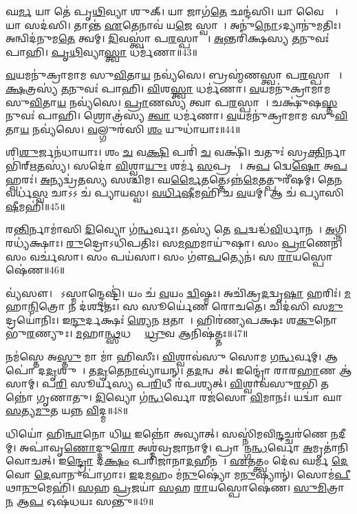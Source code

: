 𑌘\ul{𑌰𑍍𑌮} 𑌯𑌾 𑌤𑍇॑ 𑌪𑍃\ul{𑌥𑌿}𑌵𑍍𑌯𑌾 𑌶𑍁𑌕𑍍। 
𑌯𑌾 𑌜𑌾𑌗॑\ul{𑌤𑍇} 𑌛𑌨𑍍𑌦॑𑌸𑌿। 
𑌯𑌾 𑌵𑍈𑌶𑍍𑌯𑍇᳚। 
𑌯𑌾 𑌸𑌦॑𑌸𑌿। 
𑌤𑌾𑌨𑍍𑌤॑ \ul{𑌏}𑌤𑍇𑌨𑌾𑌵॑ 𑌯\ul{𑌜𑍇} 𑌸𑍍𑌵𑌾𑌹𑌾᳚। 
𑌅𑌨𑍁॑\ul{𑌨𑍋}𑌽𑌦𑍍𑌯𑌾𑌨𑍁॑𑌮𑌤𑌿𑌃। 
𑌅𑌨𑍍𑌵𑌿𑌦॑𑌨𑍁𑌮\ul{𑌤𑍇} 𑌤𑍍𑌵𑌮𑍍। 
\ul{𑌦𑌿}𑌵𑌸𑍍𑌤𑍍𑌵𑌾॑ 𑌪\ul{𑌰}𑌸𑍍𑌪𑌾𑌯𑌾𑌃᳚। 
\ul{𑌅}𑌨𑍍𑌤𑌰𑌿॑𑌕𑍍𑌷𑌸𑍍𑌯 \ul{𑌤}𑌨𑍁𑌵𑌃॑ 𑌪𑌾𑌹𑌿। 
\ul{𑌪𑍃}\ul{𑌥𑌿}𑌵𑍍𑌯𑌾\ul{𑌸𑍍𑌤𑍍𑌵𑌾} 𑌧𑌰𑍍𑌮॑𑌣𑌾॥43॥

\ul{𑌵}𑌯𑌮𑌨𑍁॑𑌕𑍍𑌰𑌾𑌮𑌾𑌮 𑌸𑍁\ul{𑌵𑌿}𑌤𑌾\ul{𑌯} 𑌨𑌵𑍍𑌯॑𑌸𑍇। 
𑌬𑍍𑌰𑌹𑍍𑌮॑𑌣𑌸𑍍𑌤𑍍𑌵𑌾 𑌪\ul{𑌰}𑌸𑍍𑌪𑌾𑌯𑌾𑌃᳚। 
\ul{𑌕𑍍𑌷}𑌤𑍍𑌰𑌸𑍍𑌯॑ \ul{𑌤}𑌨𑍁𑌵𑌃॑ 𑌪𑌾𑌹𑌿। 
\ul{𑌵𑌿}𑌶\ul{𑌸𑍍𑌤𑍍𑌵𑌾} 𑌧𑌰𑍍𑌮॑𑌣𑌾। 
\ul{𑌵}𑌯𑌮𑌨𑍁॑𑌕𑍍𑌰𑌾𑌮𑌾𑌮 𑌸𑍁\ul{𑌵𑌿}𑌤𑌾\ul{𑌯} 𑌨𑌵𑍍𑌯॑𑌸𑍇। 
\ul{𑌪𑍍𑌰𑌾}𑌣𑌸𑍍𑌯॑ 𑌤𑍍𑌵𑌾 𑌪\ul{𑌰}𑌸𑍍𑌪𑌾𑌯𑍈᳚। 
𑌚𑌕𑍍𑌷𑍁॑𑌷\ul{𑌸𑍍𑌤}𑌨𑍁𑌵𑌃॑ 𑌪𑌾𑌹𑌿। 
𑌶𑍍𑌰𑍋𑌤𑍍𑌰॑𑌸𑍍𑌯 \ul{𑌤𑍍𑌵𑌾} 𑌧𑌰𑍍𑌮॑𑌣𑌾। 
\ul{𑌵}𑌯𑌮𑌨𑍁॑𑌕𑍍𑌰𑌾𑌮𑌾𑌮 𑌸𑍁\ul{𑌵𑌿}𑌤𑌾\ul{𑌯} 𑌨𑌵𑍍𑌯॑𑌸𑍇। 
\ul{𑌵}𑌲𑍍𑌗𑍁𑌰॑𑌸𑌿 \ul{𑌶𑌂} 𑌯𑍁𑌧𑌾॑𑌯𑌾𑌃॥44॥

𑌶𑌿\ul{𑌶𑍁}𑌰𑍍𑌜𑌨॑𑌧𑌾𑌯𑌾𑌃। 
𑌶𑌂 \ul{𑌚} 𑌵\ul{𑌕𑍍𑌷𑌿} 𑌪𑌰𑌿॑ \ul{𑌚} 𑌵𑌕𑍍𑌷𑌿॑। 
𑌚𑌤𑍁𑌃॑ 𑌸𑍍𑌰\ul{𑌕𑍍𑌤𑌿}𑌰𑍍𑌨𑌾𑌭𑌿॑𑌰𑍍\mbox{}\ul{𑌋}𑌤𑌸𑍍𑌯॑। 
𑌸𑌦𑍋॑ \ul{𑌵𑌿}𑌶𑍍𑌵𑌾\ul{𑌯𑍁𑌃} 𑌶𑌰𑍍𑌮॑ \ul{𑌸}𑌪𑍍𑌰𑌥𑌾𑌃᳚। 
𑌅\ul{𑌪} 𑌦𑍍𑌵𑍇\ul{𑌷𑍋} 𑌅\ul{𑌪} 𑌹𑍍𑌵𑌰𑌃॑। 
\ul{𑌅}𑌨𑍍𑌯𑌦𑍍𑌵𑍍𑌰॑𑌤𑌸𑍍𑌯 𑌸𑌶𑍍𑌚𑌿𑌮। 
𑌘\ul{𑌰𑍍𑌮𑍈}𑌤𑌤𑍍𑌤𑍇𑌽𑌨𑍍𑌨॑\ul{𑌮𑍇}𑌤𑌤𑍍𑌪𑍁𑌰𑍀॑𑌷𑌮𑍍। 
𑌤𑍇\ul{𑌨} 𑌵𑌰𑍍𑌧॑\ul{𑌸𑍍𑌵} 𑌚𑌾𑌽𑌽 𑌚॑ 𑌪𑍍𑌯𑌾𑌯𑌸𑍍𑌵। 
\ul{𑌵}\ul{𑌰𑍍𑌧𑌿}\ul{𑌷𑍀}𑌮𑌹𑌿॑ 𑌚 \ul{𑌵}𑌯𑌮𑍍। 
𑌆 𑌚॑ 𑌪𑍍𑌯𑌾𑌸𑌿\ul{𑌷𑍀}𑌮𑌹𑌿॑॥45॥

𑌰\ul{𑌨𑍍𑌤𑌿}𑌰𑍍𑌨𑌾𑌮𑌾॑𑌸𑌿 \ul{𑌦𑌿}𑌵𑍍𑌯𑍋 𑌗॑\ul{𑌨𑍍𑌧}𑌰𑍍𑌵𑌃। 
𑌤𑌸𑍍𑌯॑ 𑌤𑍇 \ul{𑌪}𑌦𑍍𑌵𑌦𑍍𑌧॑\ul{𑌵𑌿}𑌰𑍍𑌧𑌾𑌨𑌮𑍍᳚। 
\ul{𑌅}𑌗𑍍𑌨𑌿𑌰𑌧𑍍𑌯॑𑌕𑍍𑌷𑌾𑌃। 
\ul{𑌰𑍁}𑌦𑍍𑌰𑍋𑌽𑌧𑌿॑𑌪𑌤𑌿𑌃। 
𑌸\ul{𑌮}𑌹𑌮𑌾𑌯𑍁॑𑌷𑌾। 
𑌸𑌂 \ul{𑌪𑍍𑌰𑌾}𑌣𑍇𑌨॑। 
𑌸𑌂 𑌵𑌰𑍍𑌚॑𑌸𑌾। 
𑌸𑌂 𑌪𑌯॑𑌸𑌾। 
𑌸𑌂 𑌗𑍗॑\ul{𑌪}𑌤𑍍𑌯𑍇𑌨॑। 
𑌸 \ul{𑌰𑌾}𑌯𑌸𑍍𑌪𑍋𑌷𑍇॑𑌣॥46॥

𑌵𑍍𑌯॑𑌸𑍗। 
𑌯𑍋᳚𑌽𑌸𑍍𑌮𑌾𑌨𑍍𑌦𑍍𑌵𑍇𑌷𑍍𑌟𑌿॑। 
𑌯𑌂 𑌚॑ \ul{𑌵}𑌯𑌂 \ul{𑌦𑍍𑌵𑌿}𑌷𑍍𑌮𑌃। 
𑌅𑌚𑌿॑𑌕𑍍𑌰\ul{𑌦}𑌦𑍍𑌵𑍃\ul{𑌷𑌾} 𑌹𑌰𑌿𑌃॑। 
\ul{𑌮}𑌹𑌾\ul{𑌨𑍍𑌮𑌿}𑌤𑍍𑌰𑍋 𑌨 𑌦॑𑌰𑍍\mbox{}\ul{𑌶}𑌤𑌃। 
𑌸 𑌸𑍂𑌰𑍍𑌯𑍇॑𑌣 𑌰𑍋𑌚𑌤𑍇। 
𑌚𑌿𑌦॑𑌸𑌿 𑌸\ul{𑌮𑍁}𑌦𑍍𑌰𑌯𑍋॑𑌨𑌿𑌃। 
𑌇\ul{𑌨𑍍𑌦𑍁}𑌰𑍍𑌦𑌕𑍍𑌷𑌃॑ \ul{𑌶𑍍𑌯𑍇}𑌨 \ul{𑌋}𑌤𑌾𑌵𑌾᳚। 
𑌹𑌿𑌰॑𑌣𑍍𑌯𑌪𑌕𑍍𑌷𑌃  𑌶\ul{𑌕𑍁}𑌨𑍋 𑌭𑍁॑\ul{𑌰}𑌣𑍍𑌯𑍁𑌃। 
\ul{𑌮}𑌹𑌾\ul{𑌨𑍍𑌥𑍍𑌸}𑌧𑌸𑍍𑌥𑍇᳚ \ul{𑌧𑍍𑌰𑍁}𑌵 𑌆𑌨𑌿𑌷॑𑌤𑍍𑌤𑌃॥47॥

𑌨𑌮॑𑌸𑍍𑌤𑍇 𑌅\ul{𑌸𑍍𑌤𑍁} 𑌮𑌾 𑌮𑌾॑ 𑌹𑌿𑌸𑍀𑌃। 
\ul{𑌵𑌿}𑌶𑍍𑌵𑌾𑌵॑𑌸𑍁 𑌸𑍋𑌮 𑌗\ul{𑌨𑍍𑌧}𑌰𑍍𑌵𑌮𑍍। 
𑌆𑌪𑍋॑ 𑌦\ul{𑌦𑍃}𑌶𑍁𑌷𑍀𑌃᳚। 
𑌤\ul{𑌦𑍃}𑌤𑍇\ul{𑌨𑌾}𑌵𑍍𑌯𑌾॑𑌯𑌨𑍍। 
𑌤\ul{𑌦}𑌨𑍍𑌵𑌵𑍈᳚𑌤𑍍। 
𑌇𑌨𑍍𑌦𑍍𑌰𑍋॑ 𑌰𑌾𑌰\ul{𑌹𑌾}𑌣 𑌆॑𑌸𑌾𑌮𑍍। 
𑌪\ul{𑌰𑌿} 𑌸𑍂𑌰𑍍𑌯॑𑌸𑍍𑌯 𑌪\ul{𑌰𑌿}𑌧𑍀 𑌰॑𑌪𑌶𑍍𑌯𑌤𑍍। 
\ul{𑌵𑌿}𑌶𑍍𑌵𑌾𑌵॑𑌸𑍁\ul{𑌰}𑌭𑌿 𑌤𑌨𑍍𑌨𑍋॑ 𑌗𑍃𑌣𑌾𑌤𑍁। 
\ul{𑌦𑌿}𑌵𑍍𑌯𑍋 𑌗॑\ul{𑌨𑍍𑌧}𑌰𑍍𑌵𑍋 𑌰𑌜॑𑌸𑍋 \ul{𑌵𑌿}𑌮𑌾𑌨𑌃॑। 
𑌯𑌦𑍍𑌵𑌾॑ 𑌘𑌾 \ul{𑌸}𑌤𑍍𑌯\ul{𑌮𑍁}𑌤 𑌯𑌨𑍍𑌨 \ul{𑌵𑌿}𑌦𑍍𑌮॥48॥

𑌧𑌿𑌯𑍋॑ 𑌹𑌿\ul{𑌨𑍍𑌵𑌾}𑌨𑍋 𑌧𑌿\ul{𑌯} 𑌇𑌨𑍍𑌨𑍋॑ 𑌅𑌵𑍍𑌯𑌾𑌤𑍍। 
𑌸𑌸𑍍𑌨𑌿॑𑌮𑌵𑌿\ul{𑌨𑍍𑌦}𑌚𑍍𑌚𑌰॑𑌣𑍇 \ul{𑌨}𑌦𑍀𑌨𑌾᳚𑌮𑍍। 
𑌅𑌪𑌾॑𑌵𑍃\ul{𑌣𑍋}𑌦𑍍𑌦𑍁\ul{𑌰𑍋} 𑌅𑌶𑍍𑌮॑𑌵𑍍𑌰𑌜𑌾𑌨𑌾𑌮𑍍। 
𑌪𑍍𑌰𑌾𑌸𑌾᳚𑌨𑍍𑌗\ul{𑌨𑍍𑌧}𑌰𑍍𑌵𑍋 \ul{𑌅}𑌮𑍃𑌤𑌾॑𑌨𑌿 𑌵𑍋𑌚𑌤𑍍। 
𑌇\ul{𑌨𑍍𑌦𑍍𑌰𑍋} 𑌦\ul{𑌕𑍍𑌷𑌂} 𑌪𑌰𑌿॑𑌜𑌾𑌨𑌾\ul{𑌦}𑌹𑍀𑌨𑌮𑍍᳚। 
\ul{𑌏}𑌤𑌤𑍍𑌤𑍍𑌵𑌂 𑌦𑍇॑𑌵 𑌘𑌰𑍍𑌮 \ul{𑌦𑍇}𑌵𑍋 \ul{𑌦𑍇}𑌵𑌾𑌨𑍁𑌪𑌾॑𑌗𑌾𑌃। 
\ul{𑌇}𑌦\ul{𑌮}𑌹𑌂 𑌮॑\ul{𑌨𑍁}𑌷𑍍𑌯𑍋॑ 𑌮\ul{𑌨𑍁}𑌷𑍍𑌯𑌾𑌨𑍍॑। 
𑌸𑍋𑌮॑\ul{𑌪𑍀}𑌥𑌾\ul{𑌨𑍁}𑌮𑍇𑌹𑌿॑। 
\ul{𑌸}𑌹 \ul{𑌪𑍍𑌰}𑌜𑌯𑌾॑ \ul{𑌸}𑌹 \ul{𑌰𑌾}𑌯𑌸𑍍𑌪𑍋𑌷𑍇॑𑌣। 
\ul{𑌸𑍁}\ul{𑌮𑌿}𑌤𑍍𑌰𑌾 \ul{𑌨} 𑌆\ul{𑌪} 𑌓𑌷॑𑌧𑌯𑌃 𑌸𑌨𑍍𑌤𑍁॥49॥

